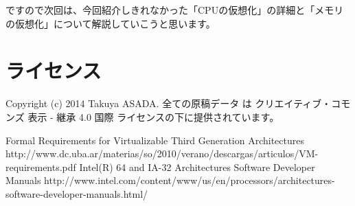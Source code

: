 \documentclass[a4j,12pt]{jarticle}
\begin{document}
ですので次回は、今回紹介しきれなかった「CPUの仮想化」の詳細と「メモリの仮想化」について解説していこうと思います。

\section{ライセンス}
Copyright (c) 2014 Takuya ASADA.
全ての原稿データ は クリエイティブ・コモンズ 表示 - 継承 4.0 国際 ライセンスの下に提供されています。

\begin{thebibliography}{4}
   Formal Requirements for Virtualizable Third Generation Architectures http://www.dc.uba.ar/materias/so/2010/verano/descargas/articulos/VM-requirements.pdf
   Intel(R) 64 and IA-32 Architectures Software Developer Manuals http://www.intel.com/content/www/us/en/processors/architectures-software-developer-manuals.html/
\end{thebibliography}
\end{document}
